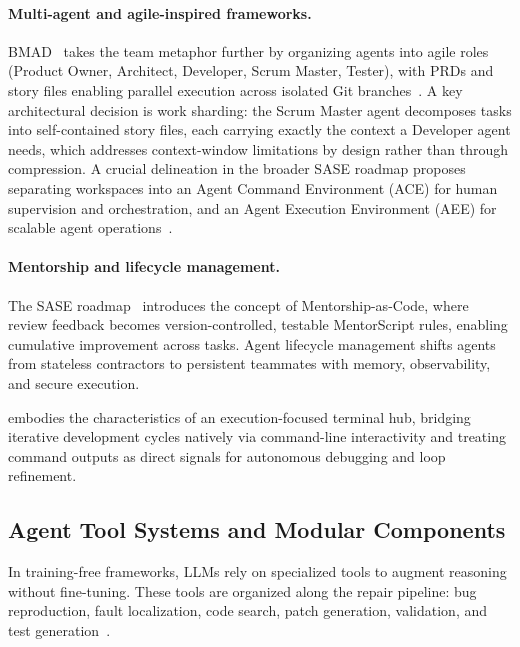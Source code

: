 \paragraph{Multi-agent and agile-inspired frameworks.} BMAD~\cite{blackington2025bmad} takes the team metaphor further by organizing agents into agile roles (Product Owner, Architect, Developer, Scrum Master, Tester), with PRDs and story files enabling parallel execution across isolated Git branches~\cite{sase_survey}. A key architectural decision is work sharding: the Scrum Master agent decomposes tasks into self-contained story files, each carrying exactly the context a Developer agent needs, which addresses context-window limitations by design rather than through compression. A crucial delineation in the broader SASE roadmap proposes separating workspaces into an Agent Command Environment (ACE) for human supervision and orchestration, and an Agent Execution Environment (AEE) for scalable agent operations~\cite{sase_survey}.

\paragraph{Mentorship and lifecycle management.} The SASE roadmap~\cite{sase_survey} introduces the concept of Mentorship-as-Code, where review feedback becomes version-controlled, testable MentorScript rules, enabling cumulative improvement across tasks. Agent lifecycle management shifts agents from stateless contractors to persistent teammates with memory, observability, and secure execution.

\name embodies the characteristics of an execution-focused terminal hub, bridging iterative development cycles natively via command-line interactivity and treating command outputs as direct signals for autonomous debugging and loop refinement.

\subsection{Agent Tool Systems and Modular Components}
In training-free frameworks, LLMs rely on specialized tools to augment reasoning without fine-tuning. These tools are organized along the repair pipeline: bug reproduction, fault localization, code search, patch generation, validation, and test generation~\cite{issue_resolution_survey}.

